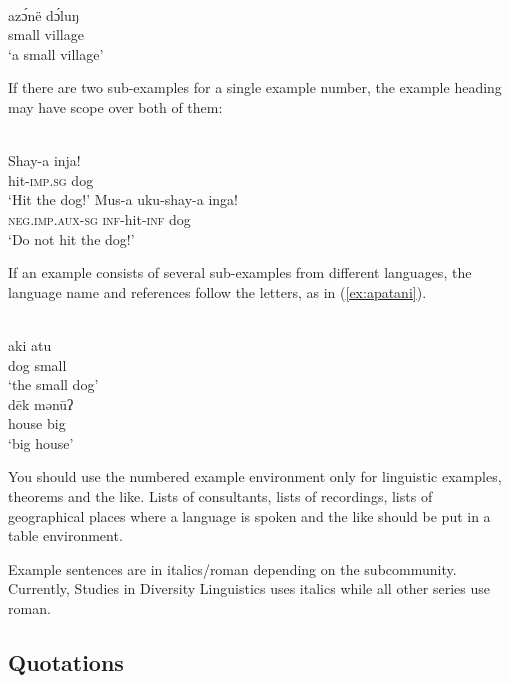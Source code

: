 {\def\exfont{\normalsize\itshape}
\ea\label{ex-typology}
\\
\gll azɔ́në dɔ́luŋ\\
     small village\\ 
\glt `a small village' 
\z


If there are two sub-examples for a single example number, the example heading may have scope over both of them:

\ea
{}\\
\ea
\gll Shay-a		inja!\\
hit-\textsc{imp.sg}	dog\\
\glt `Hit the dog!'
\ex
\gll	Mus-a	uku-shay-a	inga! \\
	\textsc{neg.imp.aux-sg}	\textsc{inf}-hit-\textsc{inf}	dog \\
\glt		`Do not hit the dog!'	
\z
\z

If an example consists of several sub-examples from different languages, the language name and references follow the letters, as in (\ref{ex:apatani}).

\ea\label{ex:apatani}
\ea
{}\\
\gll aki atu\\ 
     dog small\\ 
\glt ‘the small dog’ 
\ex 
{}\\ 
\gll dēk mənūʔ\\
     house big\\
\glt ‘big house’ 
\z
\z

You should use the numbered example environment only for linguistic examples, theorems and the like. Lists of consultants, lists of recordings, lists of geographical places where a language is spoken and the like should be put in a table environment. 

Example sentences are in italics/roman depending on the subcommunity. Currently, Studies in Diversity Linguistics uses italics while all other series use roman.}



\subsection{Quotations}

